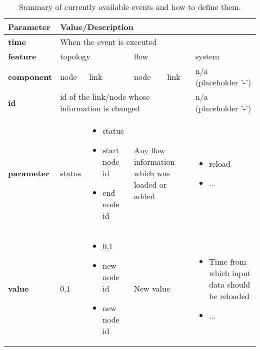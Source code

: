 \documentclass[11pt,fleqn]{book} %
\begin{document}
\begin{table}[h]
	\centering
	\begin{tabular}{|l| l|l|l | l| l|}
	\hline
	\rowcolor{Gray}
	Parameter & \multicolumn{5}{l|}{Value/Description}\\
	\hline
	\textbf{time} & \multicolumn{5}{l|}{When the event is executed} \\ \hline
	\textbf{feature} & \multicolumn{2}{l|}{topology} & \multicolumn{2}{l|}{flow} & system \\ \hline
	\textbf{component} & node & link & node & link & n/a (placeholder '-') \\ \hline
	\textbf{id} & \multicolumn{4}{l|}{id of the link/node whose information is changed} & n/a (placeholder '-') \\
	\hline
	\textbf{parameter} & status & \multicolumn{1}{p{2.5cm}|}{\begin{itemize}[leftmargin=*,label={-}]
			\item status
			\item start node id
			\item end node id
		\end{itemize}} & \multicolumn{2}{p{4.5cm}|}{Any flow information which was loaded or added} & \multicolumn{1}{p{2.5cm}|}{\begin{itemize}[leftmargin=*,label={-}]
		\item reload
		\item ...
	\end{itemize}}\\
	\hline
	\textbf{value} & 0,1 & \multicolumn{1}{p{2.5cm}|}{\begin{itemize}[leftmargin=*,label={-}]
			\item 0,1
			\item new node id
			\item new node id
		\end{itemize}} & \multicolumn{2}{p{4.5cm}|}{New value} & \multicolumn{1}{p{3cm}|}{\begin{itemize}[leftmargin=*,label={-}]
		\item Time from which input data should be reloaded
		\item ...
	\end{itemize}}\\
	\hline	
	\end{tabular}
	\caption{Summary of currently available events and how to define them.}
	\label{table:events}
\end{table}
\end{document}
